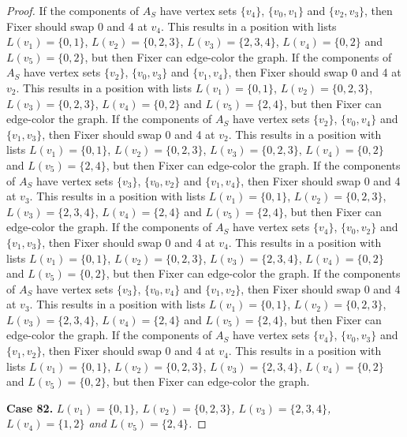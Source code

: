 \documentclass[12pt]{amsart}
\theoremstyle{plain}
\theoremstyle{definition}
\theoremstyle{remark}
\begin{document}
\begin{proof}
If the components of $A_S$ have vertex sets $\{v_4\}$, $\{v_0, v_1\}$ and $\{v_2, v_3\}$, then Fixer should swap 0 and 4 at $v_4$. This results in a position with lists $L(v_1) = \{0, 1\}$, $L(v_2) = \{0, 2, 3\}$, $L(v_3) = \{2, 3, 4\}$, $L(v_4) = \{0, 2\}$ and $L(v_5) = \{0, 2\}$, but then Fixer can edge-color the graph.
If the components of $A_S$ have vertex sets $\{v_2\}$, $\{v_0, v_3\}$ and $\{v_1, v_4\}$, then Fixer should swap 0 and 4 at $v_2$. This results in a position with lists $L(v_1) = \{0, 1\}$, $L(v_2) = \{0, 2, 3\}$, $L(v_3) = \{0, 2, 3\}$, $L(v_4) = \{0, 2\}$ and $L(v_5) = \{2, 4\}$, but then Fixer can edge-color the graph.
If the components of $A_S$ have vertex sets $\{v_2\}$, $\{v_0, v_4\}$ and $\{v_1, v_3\}$, then Fixer should swap 0 and 4 at $v_2$. This results in a position with lists $L(v_1) = \{0, 1\}$, $L(v_2) = \{0, 2, 3\}$, $L(v_3) = \{0, 2, 3\}$, $L(v_4) = \{0, 2\}$ and $L(v_5) = \{2, 4\}$, but then Fixer can edge-color the graph.
If the components of $A_S$ have vertex sets $\{v_3\}$, $\{v_0, v_2\}$ and $\{v_1, v_4\}$, then Fixer should swap 0 and 4 at $v_3$. This results in a position with lists $L(v_1) = \{0, 1\}$, $L(v_2) = \{0, 2, 3\}$, $L(v_3) = \{2, 3, 4\}$, $L(v_4) = \{2, 4\}$ and $L(v_5) = \{2, 4\}$, but then Fixer can edge-color the graph.
If the components of $A_S$ have vertex sets $\{v_4\}$, $\{v_0, v_2\}$ and $\{v_1, v_3\}$, then Fixer should swap 0 and 4 at $v_4$. This results in a position with lists $L(v_1) = \{0, 1\}$, $L(v_2) = \{0, 2, 3\}$, $L(v_3) = \{2, 3, 4\}$, $L(v_4) = \{0, 2\}$ and $L(v_5) = \{0, 2\}$, but then Fixer can edge-color the graph.
If the components of $A_S$ have vertex sets $\{v_3\}$, $\{v_0, v_4\}$ and $\{v_1, v_2\}$, then Fixer should swap 0 and 4 at $v_3$. This results in a position with lists $L(v_1) = \{0, 1\}$, $L(v_2) = \{0, 2, 3\}$, $L(v_3) = \{2, 3, 4\}$, $L(v_4) = \{2, 4\}$ and $L(v_5) = \{2, 4\}$, but then Fixer can edge-color the graph.
If the components of $A_S$ have vertex sets $\{v_4\}$, $\{v_0, v_3\}$ and $\{v_1, v_2\}$, then Fixer should swap 0 and 4 at $v_4$. This results in a position with lists $L(v_1) = \{0, 1\}$, $L(v_2) = \{0, 2, 3\}$, $L(v_3) = \{2, 3, 4\}$, $L(v_4) = \{0, 2\}$ and $L(v_5) = \{0, 2\}$, but then Fixer can edge-color the graph.

\noindent\textbf{Case 82.  }\textit{$L(v_1) = \{0, 1\}$, $L(v_2) = \{0, 2, 3\}$, $L(v_3) = \{2, 3, 4\}$, $L(v_4) = \{1, 2\}$ and $L(v_5) = \{2, 4\}$.}


\end{proof}
\end{document}
